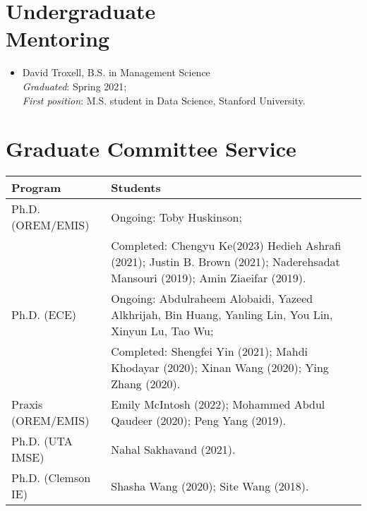 \documentclass[hyperref, margin]{myResume}
\begin{document}
\begin{resume}
\section{Undergraduate \\Mentoring}
	\begin{itemize}[leftmargin=*]\itemsep0em
		\item David Troxell, B.S. in Management Science\\		
		\emph{Graduated}: Spring 2021;\\
		\emph{First position}: M.S. student in Data Science, Stanford University.
	\end{itemize}
	
\section{Graduate Committee Service}
	\vspace*{0.5cm}
	\begin{table}[h!] \renewcommand{\arraystretch}{1.3}
		\begin{tabular}{p{} p{}}
			\hline
			Program & Students \\ 
			\hline
			Ph.D. (OREM/EMIS) 	& Ongoing: Toby Huskinson; \\[3pt] 
								& Completed: Chengyu Ke(2023) Hedieh Ashrafi (2021); Justin B. Brown (2021); Naderehsadat Mansouri (2019); Amin Ziaeifar (2019). \\[3pt] \hline
			Ph.D. (ECE)  		& Ongoing: Abdulraheem Alobaidi, Yazeed Alkhrijah, Bin Huang, Yanling Lin, You Lin, Xinyun Lu, Tao Wu; \\ [3pt]
								& Completed: Shengfei Yin (2021); Mahdi Khodayar (2020); Xinan Wang (2020); Ying Zhang (2020). \\ [3pt]\hline
			Praxis (OREM/EMIS)	& Emily McIntosh (2022); Mohammed Abdul Qaudeer (2020); Peng Yang (2019). \\ [3pt]\hline
			Ph.D. (UTA IMSE)	& Nahal Sakhavand (2021). \\ [3pt] \hline
			Ph.D. (Clemson IE)	& Shasha Wang (2020); Site Wang (2018). \\ [3pt]\hline
		\end{tabular}
	\end{table}
	
\sloppy

\end{resume}
\end{document}
